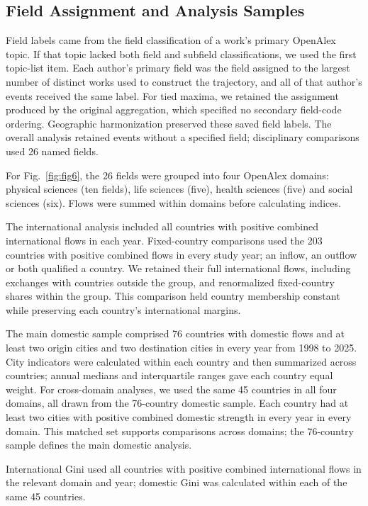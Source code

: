 \subsection{Field Assignment and Analysis Samples}

Field labels came from the field classification of a work's primary OpenAlex topic. If that topic lacked both field and subfield classifications, we used the first topic-list item. Each author's primary field was the field assigned to the largest number of distinct works used to construct the trajectory, and all of that author's events received the same label. For tied maxima, we retained the assignment produced by the original aggregation, which specified no secondary field-code ordering. Geographic harmonization preserved these saved field labels. The overall analysis retained events without a specified field; disciplinary comparisons used 26 named fields.

For Fig.~\ref{fig:fig6}, the 26 fields were grouped into four OpenAlex domains: physical sciences (ten fields), life sciences (five), health sciences (five) and social sciences (six). Flows were summed within domains before calculating indices.

The international analysis included all countries with positive combined international flows in each year. Fixed-country comparisons used the 203 countries with positive combined flows in every study year; an inflow, an outflow or both qualified a country. We retained their full international flows, including exchanges with countries outside the group, and renormalized fixed-country shares within the group. This comparison held country membership constant while preserving each country's international margins.

The main domestic sample comprised 76 countries with domestic flows and at least two origin cities and two destination cities in every year from 1998 to 2025. City indicators were calculated within each country and then summarized across countries; annual medians and interquartile ranges gave each country equal weight. For cross-domain analyses, we used the same 45 countries in all four domains, all drawn from the 76-country domestic sample. Each country had at least two cities with positive combined domestic strength in every year in every domain. This matched set supports comparisons across domains; the 76-country sample defines the main domestic analysis.

International Gini used all countries with positive combined international flows in the relevant domain and year; domestic Gini was calculated within each of the same 45 countries.

